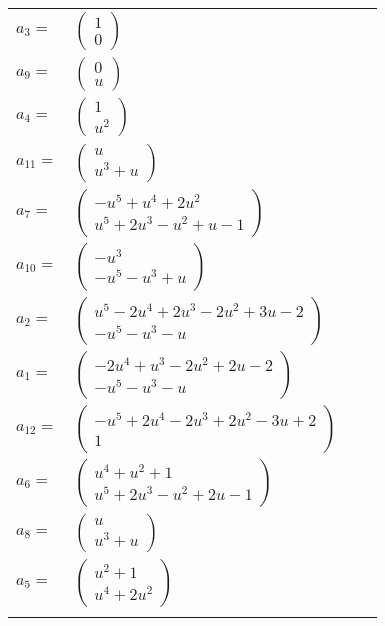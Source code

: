 \documentclass[1p]{elsarticle_modified}
\theoremstyle{definition}
\begin{document}
\begin{tabular}{m{7pt} m{180pt} m{7pt} m{180pt} }
\flushright $a_{3}=$&$\begin{pmatrix}1\\0\end{pmatrix}$ \\
\flushright $a_{9}=$&$\begin{pmatrix}0\\u\end{pmatrix}$ \\
\flushright $a_{4}=$&$\begin{pmatrix}1\\u^2\end{pmatrix}$ \\
\flushright $a_{11}=$&$\begin{pmatrix}u\\u^3+u\end{pmatrix}$ \\
\flushright $a_{7}=$&$\begin{pmatrix}- u^5+u^4+2 u^2\\u^5+2 u^3- u^2+u-1\end{pmatrix}$ \\
\flushright $a_{10}=$&$\begin{pmatrix}- u^3\\- u^5- u^3+u\end{pmatrix}$ \\
\flushright $a_{2}=$&$\begin{pmatrix}u^5-2 u^4+2 u^3-2 u^2+3 u-2\\- u^5- u^3- u\end{pmatrix}$ \\
\flushright $a_{1}=$&$\begin{pmatrix}-2 u^4+u^3-2 u^2+2 u-2\\- u^5- u^3- u\end{pmatrix}$ \\
\flushright $a_{12}=$&$\begin{pmatrix}- u^5+2 u^4-2 u^3+2 u^2-3 u+2\\1\end{pmatrix}$ \\
\flushright $a_{6}=$&$\begin{pmatrix}u^4+u^2+1\\u^5+2 u^3- u^2+2 u-1\end{pmatrix}$ \\
\flushright $a_{8}=$&$\begin{pmatrix}u\\u^3+u\end{pmatrix}$ \\
\flushright $a_{5}=$&$\begin{pmatrix}u^2+1\\u^4+2 u^2\end{pmatrix}$\\&\end{tabular}
\end{document}
